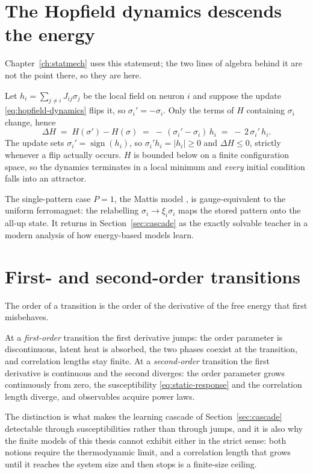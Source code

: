 \section{The Hopfield dynamics descends the energy}\label{sec:hopfield-descent}

Chapter~\ref{ch:statmech} uses this statement; the two lines of algebra behind
it are not the point there, so they are here.

Let $h_i = \sum_{j \neq i} J_{ij} \sigma_j$ be the local field on neuron $i$
and suppose the update \eqref{eq:hopfield-dynamics} flips it, so
$\sigma_i' = -\sigma_i$. Only the terms of $H$ containing $\sigma_i$ change,
hence
\begin{equation*}
  \Delta H
  \;=\; H(\sigma') - H(\sigma)
  \;=\; -\,(\sigma_i' - \sigma_i)\, h_i
  \;=\; -\,2\,\sigma_i'\, h_i .
\end{equation*}
The update sets $\sigma_i' = \operatorname{sign}(h_i)$, so
$\sigma_i' h_i = |h_i| \geq 0$ and $\Delta H \leq 0$, strictly whenever a flip
actually occurs. $H$ is bounded below on a finite configuration space, so the
dynamics terminates in a local minimum and \emph{every} initial condition falls
into an attractor.

The single-pattern case $P=1$, the Mattis model \citep{mattis1976solvable}, is
gauge-equivalent to the uniform ferromagnet: the relabelling
$\sigma_i \to \xi_i \sigma_i$ maps the stored pattern onto the all-up state.
It returns in Section~\ref{sec:cascade} as the exactly solvable teacher in a
modern analysis of how energy-based models learn.

\section{First- and second-order transitions}\label{sec:transition-order}

The order of a transition is the order of the derivative of the free energy
that first misbehaves.

At a \emph{first-order} transition the first derivative jumps: the order
parameter is discontinuous, latent heat is absorbed, the two phases coexist at
the transition, and correlation lengths stay finite. At a \emph{second-order}
transition the first derivative is continuous and the second diverges: the
order parameter grows continuously from zero, the susceptibility
\eqref{eq:static-response} and the correlation length diverge, and observables
acquire power laws.

The distinction is what makes the learning cascade of Section~\ref{sec:cascade}
detectable through susceptibilities rather than through jumps, and it is also
why the finite models of this thesis cannot exhibit either in the strict sense:
both notions require the thermodynamic limit, and a correlation length that
grows until it reaches the system size and then stops is a finite-size ceiling.

